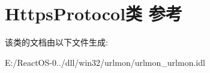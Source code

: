 \hypertarget{class_https_protocol}{}\section{Https\+Protocol类 参考}
\label{class_https_protocol}


该类的文档由以下文件生成\+:\begin{DoxyCompactItemize}
\item 
E\+:/\+React\+O\+S-\/0../dll/win32/urlmon/urlmon\+\_\+urlmon.\+idl\end{DoxyCompactItemize}
